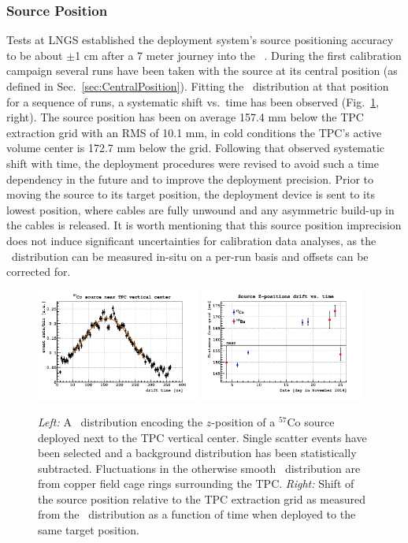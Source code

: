 \subsubsection{Source Position}\label{sec:SourcePosition}
Tests at LNGS established the deployment system's source positioning accuracy to be about $\pm$1 cm after a 7 meter journey into the \dsf\ \lsv.
During the first calibration campaign several runs have been taken with the source at its central position (as defined in Sec.~\ref{sec:CentralPosition}). %
Fitting the \tdrift\ distribution at that position for a sequence of runs, a systematic shift vs.~time has been observed (Fig.~\ref{fig:SourcePosition}, right). The source position has been on average 157.4 mm below the TPC extraction grid with an RMS of 10.1 mm, in cold conditions the TPC's active volume center is 172.7 mm below the grid. Following that observed systematic shift with time, the deployment procedures were revised to avoid such a time dependency in the future and to improve the deployment precision. Prior to moving the source to its target position, the deployment device is sent to its lowest position, where cables are fully unwound and any asymmetric build-up in the cables is released. It is worth mentioning that this source position imprecision does not induce significant uncertainties for calibration data analyses, as the \tdrift\ distribution can be measured in-situ on a per-run basis and offsets can be corrected for.
\begin{figure}[htbp]
\centering
\includegraphics[width=0.48\textwidth]{./Figures/Tdrift_distribution_Co57.png}
\includegraphics[width=0.48\textwidth]{./Figures/SourcePosition_vs_time.png}
\caption{\textit{Left:} A \tdrift\ distribution encoding the $z$-position of a $^{57}$Co source deployed next to the TPC vertical center. Single scatter events have been selected and a background distribution has been statistically subtracted. Fluctuations in the otherwise smooth \tdrift\ distribution are from copper field cage rings surrounding the TPC.
\textit{Right:} Shift of the source position relative to the TPC extraction grid as measured from the \tdrift\ distribution as a function of time when deployed to the same target position.
\label{fig:SourcePosition}} 
\end{figure}

